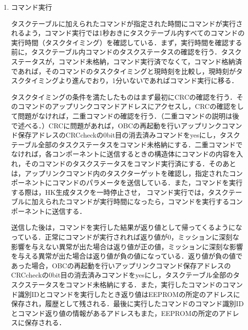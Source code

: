 \begin{enumerate}
\begin{table}[hbtp]
	\end{table}
	\par\item コマンド実行\par
	タスクテーブルに加えられたコマンドが指定された時間にコマンドが実行されるよう，コマンド実行では1秒おきにタスクテーブル内すべてのコマンドの実行時間（タスクタイミング）を確認している．まず，実行時間を確認する前に，タスクテーブル内コマンドのタスクステータスの確認を行う．タスクステータスが，コマンド未格納，コマンド実行済でなくて，コマンド格納済であれば，そのコマンドのタスクタイミングと現時刻を比較し，現時刻がタスクタイミングより進んでおり，1分いないであればコマンド実行に移る．\par
	タスクタイミングの条件を満たしたものはまず最初にCRCの確認を行う．そのコマンドのアップリンクコマンドアドレスにアクセスし，CRCの確認をして問題がなければ，二重コマンドの確認を行う．（二重コマンドの説明は後で述べる．）CRCに問題があれば，OBCの再起動を行いアップリンクコマンド保存アドレスのCRCcheckの0bit目の消去済みコマンドをyesにし，タスクテーブル全部のタスクステータスをコマンド未格納にする．二重コマンドでなければ，各コンポーネントに送信するときの構造体にコマンドの内容を入れ，そのコマンドのタスクステータスをコマンド実行済にする．そのあとは，アップリンクコマンド内のタスクターゲットを確認し，指定されたコンポーネントにコマンドのパラメータを送信している．また，コマンドを実行する際は，HK生成タスクを一時停止させ，	コマンド実行では，タスクテーブルに加えられたコマンドが実行時間になったら，コマンドを実行するコンポーネントに送信する．\par
	送信した後は，コマンドを実行した結果が返り値として帰ってくるようになっている．正常にコマンドが実行されれば返り値が0，ミッションに深刻な影響を与えない異常が出た場合は返り値が正の値，ミッションに深刻な影響を与える異常が出た場合は返り値が負の値になっている．返り値が負の値であった場合，OBCの再起動を行いアップリンクコマンド保存アドレスのCRCcheckの0bit目の消去済みコマンドをyesにし，タスクテーブル全部のタスクステータスをコマンド未格納にする．また，実行したコマンドのコマンド識別IDとコマンドを実行したとき返り値はEEPROMの所定のアドレスに保存され，履歴として残される．最後に実行したコマンドのコマンド識別IDとコマンド返り値の情報があるアドレスもまた，EEPROMの所定のアドレスに保存される．
	

\end{enumerate}
